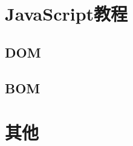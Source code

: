 \documentclass{book}
\begin{document}
\tableofcontents


\part{JavaScript教程}

\chapter{DOM}
\chapter{BOM}

\part{其他}

\end{document}
